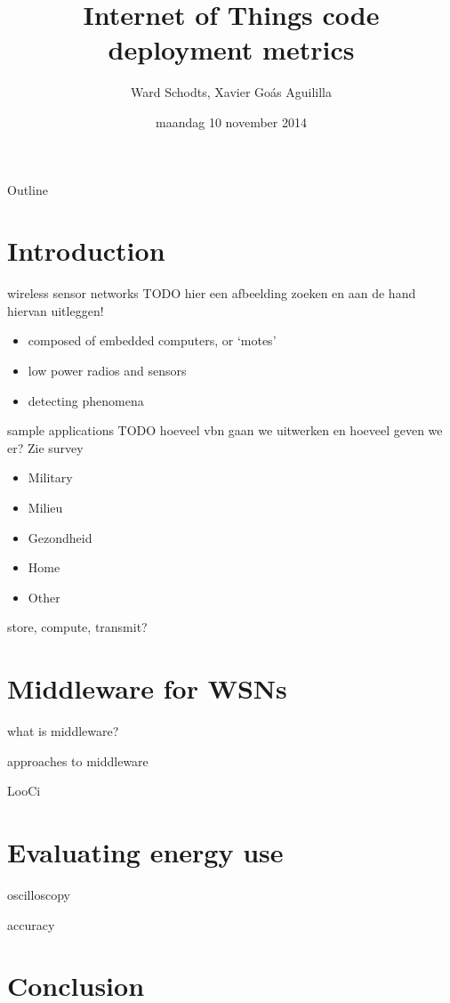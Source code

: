 \documentclass[presentation]{beamer}
\author{Ward Schodts, Xavier Goás Aguililla}
\date{maandag 10 november 2014}
\title{Internet of Things code deployment metrics}
\begin{document}
\maketitle
\begin{frame}{Outline}
\tableofcontents
\end{frame}


\section{Introduction}
\label{sec-1}
\begin{frame}[label=sec-1-1]{wireless sensor networks}
TODO hier een afbeelding zoeken en aan de hand hiervan uitleggen!
\begin{itemize}

\item composed of embedded computers, or ‘motes’
\item low power radios and sensors 
\item detecting phenomena
\end{itemize}
\end{frame}
\begin{frame}[label=sec-1-2]{sample applications}
TODO hoeveel vbn gaan we uitwerken en hoeveel geven we er? Zie survey
\begin{itemize}
\item Military
\item Milieu
\item Gezondheid
\item Home
\item Other
\end{itemize}
\end{frame}
\begin{frame}[label=sec-1-3]{store, compute, transmit?}
\end{frame}
\section{Middleware for WSNs}
\label{sec-2}
\begin{frame}[label=sec-2-1]{what is middleware?}
\end{frame}
\begin{frame}[label=sec-2-2]{approaches to middleware}
\end{frame}
\begin{frame}[label=sec-2-3]{LooCi}
\end{frame}
\section{Evaluating energy use}
\label{sec-3}
\begin{frame}[label=sec-3-1]{oscilloscopy}
\end{frame}
\begin{frame}[label=sec-3-2]{accuracy}
\end{frame}
\section{Conclusion}
\label{sec-4}
\end{document}
